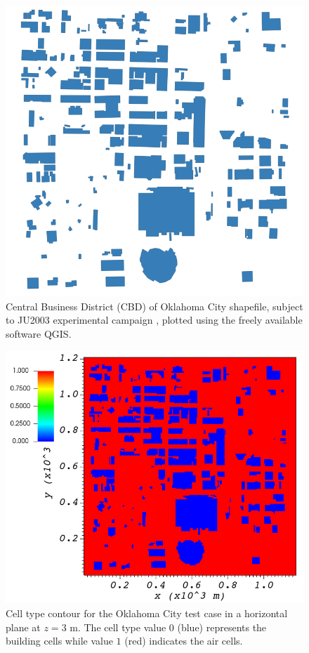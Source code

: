 \begin{figure}[H]
\centering
\includegraphics[width=13.0cm,keepaspectratio]{Images/OKC.png}
\caption{Central Business District (CBD) of Oklahoma City shapefile, subject to JU2003 experimental campaign \cite{allwine2006joint}, plotted using the freely available software QGIS.}
\end{figure}

\begin{figure}[H]
\centering
\includegraphics[width=\textwidth,keepaspectratio]{Images/oklahoma_z_3_icell.png}
\caption{Cell type contour for the Oklahoma City test case in a horizontal plane at $z=3$ m. The cell type value $0$ (blue) represents the building cells while value $1$ (red) indicates the air cells.}
\end{figure}

